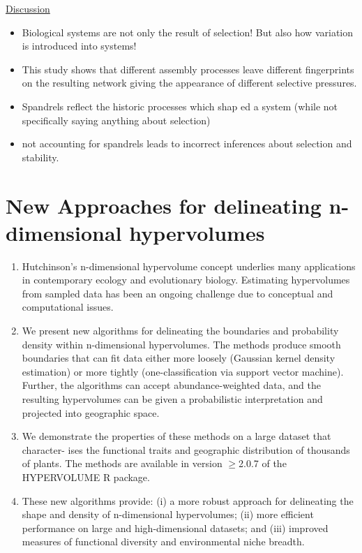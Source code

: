 \documentclass[11pt]{article}
\begin{document}
	\underline{Discussion}
	\begin{itemize}
		\item Biological systems are not only the result of selection! But also how variation is introduced into systems!
		\item This study shows that different assembly processes leave different fingerprints on the resulting network giving the appearance of different selective pressures.
		\item Spandrels reflect the historic processes which shap	ed a system (while not specifically saying anything about selection)
		\item not accounting for spandrels leads to incorrect inferences about selection and stability.
	\end{itemize}

	\section*{New Approaches for delineating n-dimensional hypervolumes \citep{Blonder2018}}
	
	\begin{enumerate}
		\item Hutchinson's n-dimensional hypervolume concept underlies many applications in contemporary ecology and evolutionary biology. Estimating hypervolumes from sampled data has been an ongoing challenge due to conceptual and computational issues.
		\item We present new algorithms for delineating the boundaries and probability density within n-dimensional hypervolumes. The methods produce smooth boundaries that can fit data either more loosely (Gaussian kernel density estimation) or more tightly (one-classification via support vector machine). Further, the algorithms can accept abundance-weighted data, and the resulting hypervolumes can be given a probabilistic interpretation and projected into geographic space.
		\item We demonstrate the properties of these methods on a large dataset that character- ises the functional traits and geographic distribution of thousands of plants. The methods are available in version $\geq$2.0.7 of the HYPERVOLUME R package.
		\item These new algorithms provide: (i) a more robust approach for delineating the shape and density of n-dimensional hypervolumes; (ii) more efficient performance on large and high-dimensional datasets; and (iii) improved measures of functional diversity and environmental niche breadth.
	\end{enumerate}
\end{document}

